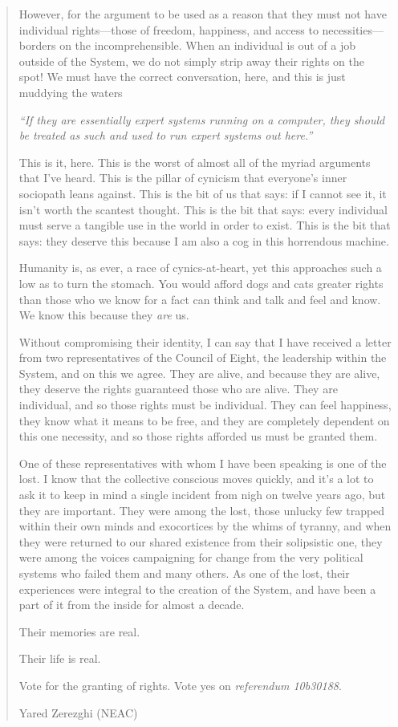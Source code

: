 \begin{quote}
However, for the argument to be used as a reason that they must not have individual rights---those of freedom, happiness, and access to necessities---borders on the incomprehensible. When an individual is out of a job outside of the System, we do not simply strip away their rights on the spot! We must have the correct conversation, here, and this is just muddying the waters

\emph{``If they are essentially expert systems running on a computer, they should be treated as such and used to run expert systems out here.''}

This is it, here. This is the worst of almost all of the myriad arguments that I've heard. This is the pillar of cynicism that everyone's inner sociopath leans against. This is the bit of us that says: if I cannot see it, it isn't worth the scantest thought. This is the bit that says: every individual must serve a tangible use in the world in order to exist. This is the bit that says: they deserve this because I am also a cog in this horrendous machine.

Humanity is, as ever, a race of cynics-at-heart, yet this approaches such a low as to turn the stomach. You would afford dogs and cats greater rights than those who we know for a fact can think and talk and feel and know. We know this because they \emph{are} us.

Without compromising their identity, I can say that I have received a letter from two representatives of the Council of Eight, the leadership within the System, and on this we agree. They are alive, and because they are alive, they deserve the rights guaranteed those who are alive. They are individual, and so those rights must be individual. They can feel happiness, they know what it means to be free, and they are completely dependent on this one necessity, and so those rights afforded us must be granted them.

One of these representatives with whom I have been speaking is one of the lost. I know that the collective conscious moves quickly, and it's a lot to ask it to keep in mind a single incident from nigh on twelve years ago, but they are important. They were among the lost, those unlucky few trapped within their own minds and exocortices by the whims of tyranny, and when they were returned to our shared existence from their solipsistic one, they were among the voices campaigning for change from the very political systems who failed them and many others. As one of the lost, their experiences were integral to the creation of the System, and have been a part of it from the inside for almost a decade.

Their memories are real.

Their life is real.

Vote for the granting of rights. Vote yes on \emph{referendum 10b30188}.

Yared Zerezghi (NEAC)
\end{quote}

